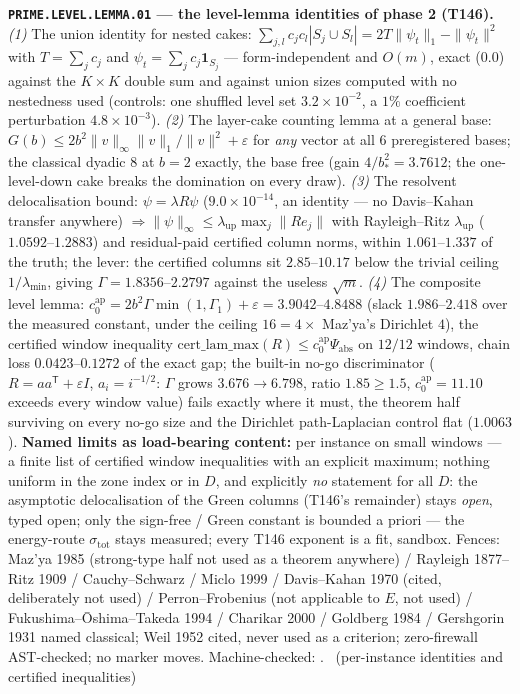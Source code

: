 \documentclass[11pt,a4paper]{article}
\begin{document}
\par\smallskip\noindent\textbf{\texttt{PRIME.LEVEL.LEMMA.01} --- the
level-lemma identities of phase 2 (T146).}
\emph{(1)} The union identity for nested cakes:
$\sum_{j,l}c_jc_l|S_j\cup S_l|=2T\|\psi_t\|_1-\|\psi_t\|^2$ with $T=\sum_jc_j$
and $\psi_t=\sum_jc_j\mathbf 1_{S_j}$ --- form-independent and $O(m)$, exact
($0.0$) against the $K\times K$ double sum and against union sizes computed
with no nestedness used (controls: one shuffled level set $3.2\times10^{-2}$,
a $1\%$ coefficient perturbation $4.8\times10^{-3}$). \emph{(2)} The
layer-cake counting lemma at a general base:
$G(b)\le2b^2\|v\|_\infty\|v\|_1/\|v\|^2+\varepsilon$ for \emph{any} vector at
all $6$ preregistered bases; the classical dyadic $8$ at $b=2$ exactly, the
base free (gain $4/b_*^2=3.7612$; the one-level-down cake breaks the
domination on every draw). \emph{(3)} The resolvent delocalisation bound:
$\psi=\lambda R\psi$ ($9.0\times10^{-14}$, an identity --- no Davis--Kahan
transfer anywhere) $\Rightarrow\|\psi\|_\infty\le\lambda_{\mathrm{up}}
\max_j\|Re_j\|$ with Rayleigh--Ritz $\lambda_{\mathrm{up}}$
($1.0592$--$1.2883$) and residual-paid certified column norms, within
$1.061$--$1.337$ of the truth; the lever: the certified columns sit
$2.85$--$10.17$ below the trivial ceiling $1/\lambda_{\min}$, giving
$\Gamma=1.8356$--$2.2797$ against the useless $\sqrt m$. \emph{(4)} The
composite level lemma:
$c_0^{\mathrm{ap}}=2b^2\Gamma\min(1,\Gamma_1)+\varepsilon=3.9042$--$4.8488$
(slack $1.986$--$2.418$ over the measured constant, under the ceiling
$16=4\times$ Maz'ya's Dirichlet $4$), the certified window inequality
$\mathrm{cert\_lam\_max}(R)\le c_0^{\mathrm{ap}}\Psi_{\mathrm{abs}}$ on
$12/12$ windows, chain loss $0.0423$--$0.1272$ of the exact gap; the built-in
no-go discriminator ($R=aa^{\mathsf T}+\varepsilon I$, $a_i=i^{-1/2}$:
$\Gamma$ grows $3.676\to6.798$, ratio $1.85\ge1.5$, $c_0^{\mathrm{ap}}=11.10$
exceeds every window value) fails exactly where it must, the theorem half
surviving on every no-go size and the Dirichlet path-Laplacian control flat
($1.0063$).
\textbf{Named limits as load-bearing content:} per instance on small windows
--- a finite list of certified window inequalities with an explicit maximum;
nothing uniform in the zone index or in $D$, and explicitly \emph{no}
statement for all $D$: the asymptotic delocalisation of the Green columns
(T146's remainder) stays \emph{open}, typed open; only the sign-free / Green
constant is bounded a priori --- the energy-route $\sigma_{\mathrm{tot}}$
stays measured; every T146 exponent is a fit, sandbox. Fences: Maz'ya 1985
(strong-type half not used as a theorem anywhere) / Rayleigh 1877--Ritz 1909 /
Cauchy--Schwarz / Miclo 1999 / Davis--Kahan 1970 (cited, deliberately not
used) / Perron--Frobenius (not applicable to $E$, not used) /
Fukushima--\=Oshima--Takeda 1994 / Charikar 2000 / Goldberg 1984 / Gershgorin
1931 named classical; Weil 1952 cited, never used as a criterion;
zero-firewall AST-checked; no marker moves.
Machine-checked: .
\mE\ (per-instance identities and certified inequalities)
\end{document}
